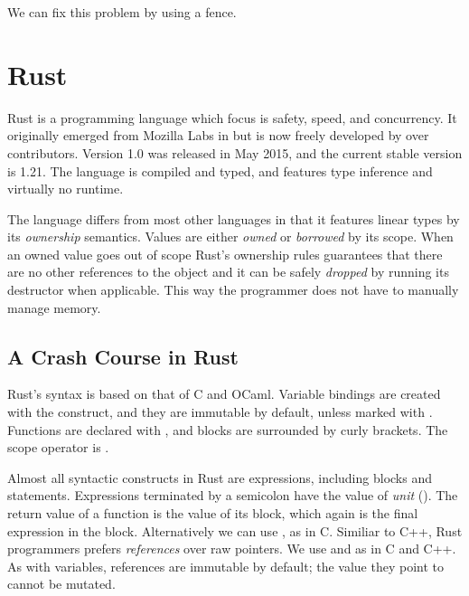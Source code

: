 \documentclass[b5paper,twoside]{report}
\begin{document}
We can fix this problem by using a fence.



\section{Rust}
Rust is a programming language which focus is safety, speed, and concurrency.
It originally emerged from Mozilla Labs in  but is now freely developed
by over  contributors.
Version 1.0 was released in May 2015, and the current stable version is 1.21.
The language is compiled and typed, and features
type inference and virtually no runtime.

The language differs from most other languages in that it features linear types
by its \emph{ownership} semantics.
Values are either \emph{owned} or \emph{borrowed} by its scope.
When an owned value goes out of scope Rust's ownership rules guarantees that
there are no other references to the object and it can be safely \emph{dropped}
by running its destructor when applicable.
This way the programmer does not have to manually manage memory.

\subsection{A Crash Course in Rust}

Rust's syntax is based on that of C and OCaml.
Variable bindings are created with the  construct,
and they are immutable by default, unless marked with .
Functions are declared with , and blocks are surrounded by curly brackets.
The scope operator is \code{::}.

Almost all syntactic constructs in Rust are expressions, including blocks and
 statements.
Expressions terminated by a semicolon have the value of \emph{unit} (\code{()}).
The return value of a function is the value of its block, which again is the final
expression in the block. Alternatively we can use , as in C.
Similiar to C++, Rust programmers prefers \emph{references} over raw pointers.
We use \code{\&} and \code{*} as in C and C++.
As with variables, references are immutable by default; the value they point
to cannot be mutated.
\end{document}
